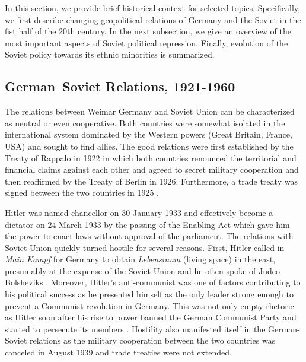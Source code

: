 In this section, we provide brief historical context for selected topics. Specifically, we first describe  changing geopolitical relations of Germany and the Soviet in the fist half of the 20th century. In the next subsection, we give an overview of the most important aspects of Soviet political repression. Finally, evolution of the Soviet policy towards its ethnic minorities is summarized.   
\subsection{German–Soviet Relations, 1921-1960} \label{subsec:relations}
The relations between Weimar Germany and Soviet Union can be characterized as neutral or even cooperative. Both countries were somewhat isolated in the international system dominated by the Western powers (Great Britain, France, USA) and sought to find allies. The good relations were first established by the Treaty of Rappalo in 1922 in which both countries renounced the territorial and financial claims against each other and agreed to secret military cooperation \citep{gatzke_russo-german_1958} and then reaffirmed by the Treaty of Berlin in 1926. Furthermore, a trade treaty was signed between the two countries in 1925 \citep{morgan_political_1963}.

Hitler was named chancellor on 30 January 1933 and effectively become a dictator on 24 March 1933 by the passing of the Enabling Act which gave him the power to enact laws without  approval of the parliament. 
The relations with Soviet Union quickly turned hostile for several reasons.  First, Hitler called in \emph{Main Kampf} for Germany to obtain \emph{Lebensraum} (living space) in the east, presumably at the expense of the Soviet Union and he often spoke of Judeo-Bolsheviks \citep[p. 6]{haslam_soviet_1984}. Moreover, Hitler's anti-communist was one of factors contributing to his political success as he presented himself as the only leader strong enough to  prevent a Communist revolution in Germany. This was not only empty rhetoric as Hitler soon after his rise to power banned the German Communist Party and started to persecute its members \citep[chapter 5]{evans_coming_2004}. Hostility also manifested itself in the German-Soviet relations as the military cooperation between the two countries was canceled in August 1939 and trade treaties were not extended.  

